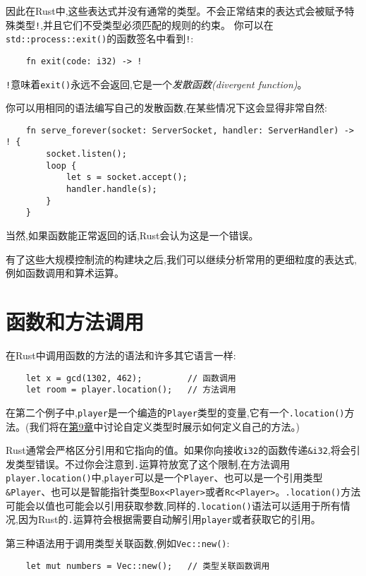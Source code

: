 因此在Rust中,这些表达式并没有通常的类型。不会正常结束的表达式会被赋予特殊类型\texttt{!},并且它们不受类型必须匹配的规则的约束。 你可以在\texttt{std::process::exit()}的函数签名中看到\texttt{!}:
\begin{verbatim}
    fn exit(code: i32) -> !
\end{verbatim}

\texttt{!}意味着\texttt{exit()}永远不会返回,它是一个\emph{发散函数(divergent function)}。

你可以用相同的语法编写自己的发散函数,在某些情况下这会显得非常自然:
\begin{verbatim}
    fn serve_forever(socket: ServerSocket, handler: ServerHandler) -> ! {
        socket.listen();
        loop {
            let s = socket.accept();
            handler.handle(s);
        }
    }
\end{verbatim}

当然,如果函数能正常返回的话,Rust会认为这是一个错误。

有了这些大规模控制流的构建块之后,我们可以继续分析常用的更细粒度的表达式,例如函数调用和算术运算。

\section{函数和方法调用}

在Rust中调用函数的方法的语法和许多其它语言一样:
\begin{verbatim}
    let x = gcd(1302, 462);         // 函数调用
    let room = player.location();   // 方法调用
\end{verbatim}

在第二个例子中,\texttt{player}是一个编造的\texttt{Player}类型的变量,它有一个\texttt{.location()}方法。(我们将在\hyperref[ch09]{第9章}中讨论自定义类型时展示如何定义自己的方法。)

Rust通常会严格区分引用和它指向的值。如果你向接收\texttt{i32}的函数传递\texttt{\&i32},将会引发类型错误。不过你会注意到\texttt{.}运算符放宽了这个限制,在方法调用\texttt{player.location()}中,\texttt{player}可以是一个\texttt{Player}、也可以是一个引用类型\texttt{\&Player}、也可以是智能指针类型\texttt{Box<Player>}或者\texttt{Rc<Player>}。\texttt{.location()}方法可能会以值也可能会以引用获取参数,同样的\texttt{.location()}语法可以适用于所有情况,因为Rust的\texttt{.}运算符会根据需要自动解引用\texttt{player}或者获取它的引用。

第三种语法用于调用类型关联函数,例如\texttt{Vec::new()}:
\begin{verbatim}
    let mut numbers = Vec::new();   // 类型关联函数调用
\end{verbatim}

